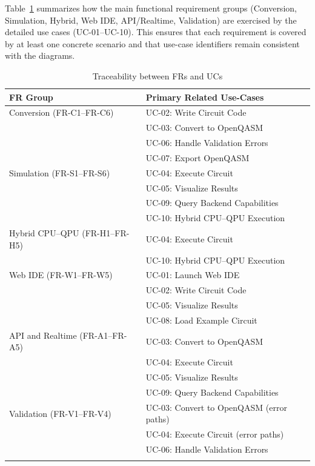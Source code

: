 Table~\ref{tab:fr-uc-traceability} summarizes how the main functional requirement groups (Conversion, Simulation, Hybrid, Web IDE, API/Realtime, Validation) are exercised by the detailed use cases (UC-01--UC-10). This ensures that each requirement is covered by at least one concrete scenario and that use-case identifiers remain consistent with the diagrams.

\begin{longtable}{p{} p{}}
\toprule
\textbf{FR Group} & \textbf{Primary Related Use-Cases} \\
\midrule
\endhead
Conversion (FR-C1--FR-C6) & 
UC-02: Write Circuit Code \\
& UC-03: Convert to OpenQASM \\
& UC-06: Handle Validation Errors \\
& UC-07: Export OpenQASM \\
\addlinespace[0.5em]
Simulation (FR-S1--FR-S6) & 
UC-04: Execute Circuit \\
& UC-05: Visualize Results \\
& UC-09: Query Backend Capabilities \\
& UC-10: Hybrid CPU--QPU Execution \\
\addlinespace[0.5em]
Hybrid CPU--QPU (FR-H1--FR-H5) & 
UC-04: Execute Circuit \\
& UC-10: Hybrid CPU--QPU Execution \\
\addlinespace[0.5em]
Web IDE (FR-W1--FR-W5) & 
UC-01: Launch Web IDE \\
& UC-02: Write Circuit Code \\
& UC-05: Visualize Results \\
& UC-08: Load Example Circuit \\
\addlinespace[0.5em]
API and Realtime (FR-A1--FR-A5) & 
UC-03: Convert to OpenQASM \\
& UC-04: Execute Circuit \\
& UC-05: Visualize Results \\
& UC-09: Query Backend Capabilities \\
\addlinespace[0.5em]
Validation (FR-V1--FR-V4) & 
UC-03: Convert to OpenQASM (error paths) \\
& UC-04: Execute Circuit (error paths) \\
& UC-06: Handle Validation Errors \\
\bottomrule
\caption{Traceability between FRs and UCs}
\label{tab:fr-uc-traceability}
\end{longtable}

